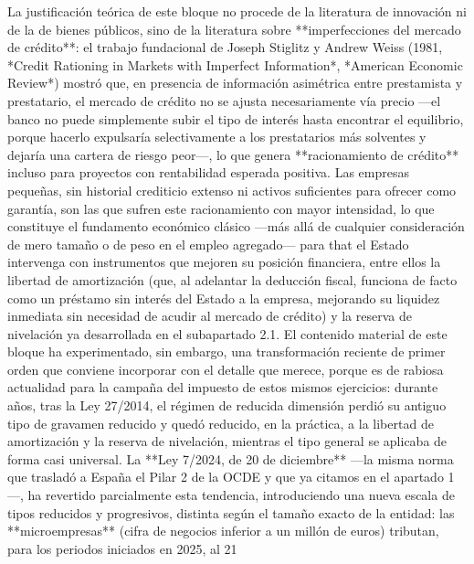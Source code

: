 \documentclass[10pt,a4paper]{article}
\begin{document}
La justificación teórica de este bloque no procede de la literatura de innovación ni de la de bienes públicos, sino de la literatura sobre **imperfecciones del mercado de crédito**: el trabajo fundacional de Joseph Stiglitz y Andrew Weiss (1981, *Credit Rationing in Markets with Imperfect Information*, *American Economic Review*) mostró que, en presencia de información asimétrica entre prestamista y prestatario, el mercado de crédito no se ajusta necesariamente vía precio —el banco no puede simplemente subir el tipo de interés hasta encontrar el equilibrio, porque hacerlo expulsaría selectivamente a los prestatarios más solventes y dejaría una cartera de riesgo peor—, lo que genera **racionamiento de crédito** incluso para proyectos con rentabilidad esperada positiva. Las empresas pequeñas, sin historial crediticio extenso ni activos suficientes para ofrecer como garantía, son las que sufren este racionamiento con mayor intensidad, lo que constituye el fundamento económico clásico —más allá de cualquier consideración de mero tamaño o de peso en el empleo agregado— para that el Estado intervenga con instrumentos que mejoren su posición financiera, entre ellos la libertad de amortización (que, al adelantar la deducción fiscal, funciona de facto como un préstamo sin interés del Estado a la empresa, mejorando su liquidez inmediata sin necesidad de acudir al mercado de crédito) y la reserva de nivelación ya desarrollada en el subapartado 2.1. El contenido material de este bloque ha experimentado, sin embargo, una transformación reciente de primer orden que conviene incorporar con el detalle que merece, porque es de rabiosa actualidad para la campaña del impuesto de estos mismos ejercicios: durante años, tras la Ley 27/2014, el régimen de reducida dimensión perdió su antiguo tipo de gravamen reducido y quedó reducido, en la práctica, a la libertad de amortización y la reserva de nivelación, mientras el tipo general se aplicaba de forma casi universal. La **Ley 7/2024, de 20 de diciembre** —la misma norma que trasladó a España el Pilar 2 de la OCDE y que ya citamos en el apartado 1—, ha revertido parcialmente esta tendencia, introduciendo una nueva escala de tipos reducidos y progresivos, distinta según el tamaño exacto de la entidad: las **microempresas** (cifra de negocios inferior a un millón de euros) tributan, para los periodos iniciados en 2025, al 21%
\end{document}
